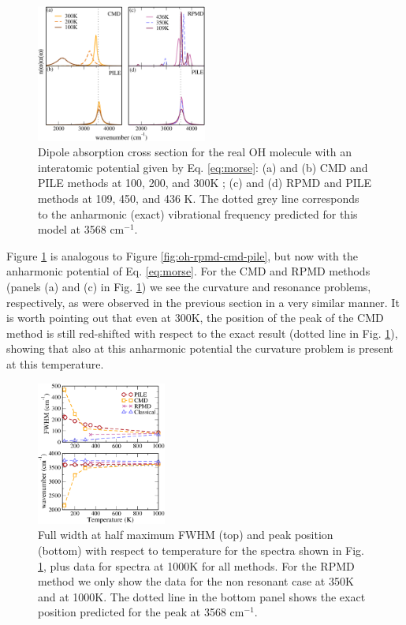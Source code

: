 \documentclass[aps,prb,superscriptaddress,amsmath,amssymb,showpacs,twocolumn]{revtex4}
\begin{document}
\begin{figure}[htbp]
\centering
\includegraphics[width=0.5\textwidth]{figures/comparison_ohanharm_factors.pdf}
\caption{Dipole absorption cross section for the real OH molecule  with an interatomic potential given by Eq. \ref{eq:morse}: (a) and (b) CMD and PILE methods at 100, 200, 
and 300K ; (c)  and (d) RPMD and PILE methods at 109, 450, and 436 K. The dotted grey line corresponds to the 
anharmonic (exact) vibrational frequency predicted for this model at 3568 cm$^{-1}$.}
\label{fig:ohreal-rpmd-cmd-pile}
\end{figure}


Figure \ref{fig:ohreal-rpmd-cmd-pile} is analogous to Figure \ref{fig:oh-rpmd-cmd-pile}, but now with the anharmonic potential of Eq. \ref{eq:morse}. For the CMD and RPMD methods (panels (a) and (c) in Fig.  \ref{fig:ohreal-rpmd-cmd-pile}) we
see the curvature and resonance problems, respectively, as were observed in the previous section in a very similar manner. It is worth pointing out that even at 300K, the position of the peak of the CMD method is still red-shifted with respect to the exact result (dotted line in Fig. \ref{fig:ohreal-rpmd-cmd-pile}), showing that also at this anharmonic potential the curvature problem is present at this temperature. 

\begin{figure}[htbp]
\centering
\includegraphics[width=0.38\textwidth]{figures/ohreal_positionbroad.pdf}
\caption{Full width at half maximum FWHM (top) and peak position (bottom) with respect to temperature for the spectra shown in Fig. \ref{fig:ohreal-rpmd-cmd-pile}, plus data for spectra at 1000K for all methods. For the RPMD method we only show the data for the non resonant case at 350K and at 1000K. The dotted line in the bottom panel shows the exact position predicted for the peak at 3568 cm$^{-1}$.}
\label{fig:ohreal-position-broad}
\end{figure}
\end{document}
